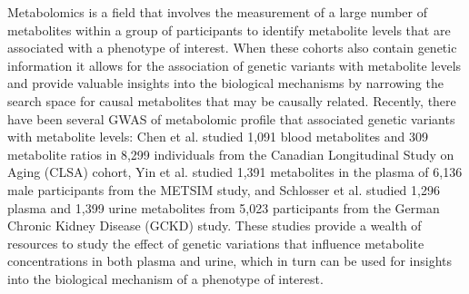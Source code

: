 \documentclass[a4paper,10pt]{article}
\begin{document}
Metabolomics is a field that involves the measurement of a large number of metabolites within a group of participants to identify metabolite levels that are associated with a phenotype of interest\citep{johnson_metabolomics_2016,li_metabolomics_2023}.
When these cohorts also contain genetic information it allows for the association of genetic variants with metabolite levels\citep{chen_genomic_2023,schlosser_genetic_2023,yin_genome-wide_2022} and provide valuable insights into the biological mechanisms by narrowing the search space for causal metabolites that may be causally related.
Recently, there have been several GWAS of metabolomic profile that associated genetic variants with metabolite levels: Chen et al.\citep{chen_genomic_2023} studied 1,091 blood metabolites and 309 metabolite ratios in 8,299 individuals from the Canadian Longitudinal Study on Aging (CLSA) cohort, Yin et al.\citep{yin_genome-wide_2022} studied 1,391 metabolites in the plasma of 6,136 male participants from the METSIM study, and Schlosser et al.\citep{schlosser_genetic_2023} studied 1,296 plasma and 1,399 urine metabolites from 5,023 participants from the German Chronic Kidney Disease (GCKD) study.
These studies provide a wealth of resources to study the effect of genetic variations that influence metabolite concentrations in both plasma and urine, which in turn can be used for insights into the biological mechanism of a phenotype of interest.
\\
\end{document}
